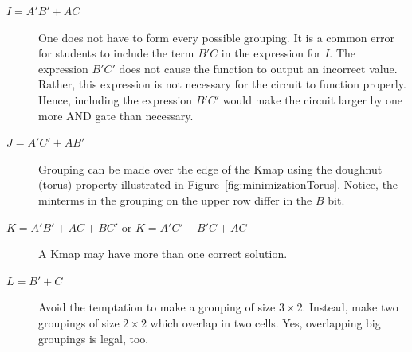 \begin{process:minimizationKmap}
\begin{description}
\item [$I=A'B'+AC$]
One does not have to form every possible grouping.  It is
a common error for students to include the term $B'C$ in the expression
for $I$.  The expression $B'C'$  does not cause the function to output
an incorrect value. Rather, this expression is not necessary for the
circuit to function properly.  Hence, including the expression $B'C'$ 
would make the circuit larger by one more AND gate than necessary.

\item [$J=A'C'+AB'$] 
Grouping can be made over the edge of the Kmap using the doughnut
 (torus) property illustrated in Figure~\ref{fig:minimizationTorus}.
Notice, the minterms in the grouping on the upper row 
differ in the $B$ bit.

\item [$K=A'B'+AC+BC'$ or $K=A'C'+B'C+AC$]
A Kmap may have more than one correct solution.

\item [$L=B'+C$]
Avoid the temptation to make a grouping of size $3 \times 2$.
Instead, make two groupings of size $2 \times 2$ which overlap 
in two cells.  Yes, overlapping big groupings is legal, too.


\end{description}
\end{process:minimizationKmap}
